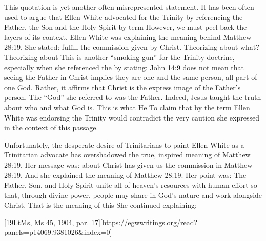 This quotation is yet another often misrepresented statement. It has been often used to argue that Ellen White advocated for the Trinity by referencing the Father, the Son and the Holy Spirit by term  However, we must peel back the layers of its context. Ellen White was explaining the meaning behind Matthew 28:19. She stated:  fulfill the commission given by Christ. Theorizing about what? Theorizing about  This is another “smoking gun” for the Trinity doctrine, especially when she referenced the  by stating:  John 14:9 does not mean that seeing the Father in Christ implies they are one and the same person, all part of one God. Rather, it affirms that Christ is the express image of the Father’s person. The “God” she referred to was the Father. Indeed, Jesus taught the truth about who and what God is. This is what He   To claim that by the term  Ellen White was endorsing the Trinity would contradict the very caution she expressed in the context of this passage.

Unfortunately, the desperate desire of Trinitarians to paint Ellen White as a Trinitarian advocate has overshadowed the true, inspired meaning of Matthew 28:19. Her message was:  about  Christ has given us the commission in Matthew 28:19. And she explained the meaning of Matthew 28:19. Her point was: The Father, Son, and Holy Spirit unite all of heaven’s resources with human effort so that, through divine power, people may share in God’s nature and work alongside Christ. That is the meaning of this  She continued explaining:

[19LtMs, Ms 45, 1904, par. 17][https://egwwritings.org/read?panels=p14069.9381026&index=0]

